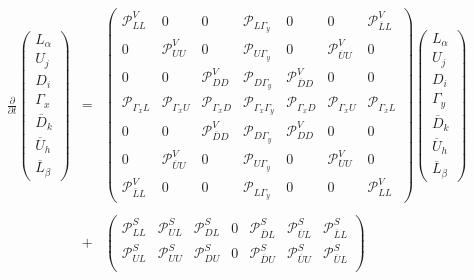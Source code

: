 \documentclass[10pt,a4paper]{article}
\begin{document}
\begin{equation}
\begin{array}{rcl}
\displaystyle 
\frac{\partial}{\partial t}
\begin{pmatrix}
L_\alpha\\
U_j \\
D_i\\
\Gamma_x\\
\overline{D}_k\\
\overline{U}_h\\
\overline{L}_\beta
\end{pmatrix} &=&
\displaystyle 
\begin{pmatrix}
\mathcal{P}_{LL}^V & 0 & 0 & \mathcal{P}_{L\Gamma_y} & 0 & 0 & \mathcal{P}_{\overline{L}L}^V \\ 
0 & \mathcal{P}_{UU}^V & 0 & \mathcal{P}_{U\Gamma_y} & 0 & \mathcal{P}_{\overline{U}U}^V & 0 \\ 
0 & 0 & \mathcal{P}_{DD}^V & \mathcal{P}_{D\Gamma_y} & \mathcal{P}_{\overline{D}D}^V & 0 & 0 \\ 
\mathcal{P}_{\Gamma_x L} & \mathcal{P}_{\Gamma_x U} & \mathcal{P}_{\Gamma_x D} & \mathcal{P}_{\Gamma_x\Gamma_y} & \mathcal{P}_{\Gamma_xD} & \mathcal{P}_{\Gamma_xU} & \mathcal{P}_{\Gamma_xL}\\
0 & 0 & \mathcal{P}_{\overline{D}D}^V & \mathcal{P}_{D\Gamma_y} & \mathcal{P}_{DD}^V & 0 & 0\\
0 & \mathcal{P}_{\overline{U}U}^V & 0 & \mathcal{P}_{U\Gamma_y} & 0 & \mathcal{P}_{UU}^V & 0\\
\mathcal{P}_{\overline{L}L}^V & 0 & 0 & \mathcal{P}_{L\Gamma_y} & 0 & 0 & \mathcal{P}_{LL}^V
\end{pmatrix}
\begin{pmatrix}
L_\alpha\\
U_j \\
D_i\\
\Gamma_y\\
\overline{D}_k\\
\overline{U}_h\\
\overline{L}_\beta
\end{pmatrix}\\
\\
&+&
\displaystyle 
\begin{pmatrix}
\mathcal{P}^S_{LL} & \mathcal{P}^S_{UL} & \mathcal{P}^S_{DL}& 0 &\mathcal{P}^S_{\overline{D}L} & \mathcal{P}^S_{\overline{U}L} & \mathcal{P}^S_{\overline{L}L} \\ 
\mathcal{P}^S_{UL} & \mathcal{P}^S_{UU} & \mathcal{P}^S_{DU} & 0 & \mathcal{P}^S_{\overline{D}U} & \mathcal{P}^S_{\overline{U}U} & \mathcal{P}^S_{\overline{U}L} \\ 

\end{pmatrix}
\end{array}
\end{equation}
\end{document}
